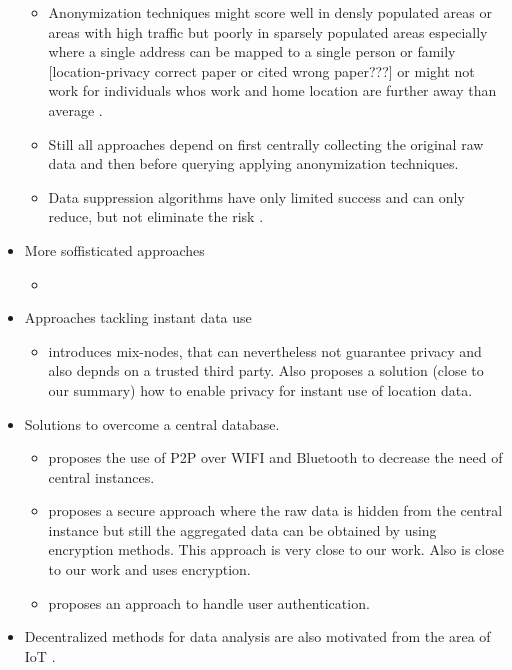 \begin{itemize}
\begin{itemize}
		\item Anonymization techniques might score well in densly populated areas or areas with high traffic but poorly in sparsely populated areas especially where a single address can be mapped to a single person or family \parencite{time-to-confusion, location-privacy, hoh2006enhancing} [location-privacy correct paper or cited wrong paper???] or might not work for individuals whos work and home location are further away than average \parencite{privacy-home-work-pairs}.
		\item Still all approaches depend on first centrally collecting the original raw data and then before querying \parencite{k-anonymity} applying anonymization techniques.
		\item Data suppression algorithms have only limited success and can only reduce, but not eliminate the risk \parencite{hoh2006enhancing}.
	\end{itemize}
	\item More soffisticated approaches
	\begin{itemize}
		\item \parencite{time-to-confusion}
	\end{itemize}
	\item Approaches tackling instant data use
	\begin{itemize}
		\item \parencite{location-privacy, mix-zones} introduces mix-nodes, that can nevertheless not guarantee privacy and also depnds on a trusted third party.
		Also \parencite{casper} proposes a solution (close to our summary) how to enable privacy for instant use of location data.
	\end{itemize}
	\item Solutions to overcome a central database.
	\begin{itemize}
		\item \parencite{p2p-android} proposes the use of P2P over WIFI and Bluetooth to decrease the need of central instances.
		\item \parencite{crowdsourcing} proposes a secure approach where the raw data is hidden from the central instance but still the aggregated data can be obtained by using encryption methods. This approach is very close to our work. Also \parencite{hoh2006enhancing} is close to our work and uses encryption.
		\item \parencite{hoh2006enhancing} proposes an approach to handle user authentication.
	\end{itemize}
	\item Decentralized methods for data analysis are also motivated from the area of IoT \parencite{iot}.
\end{itemize}

